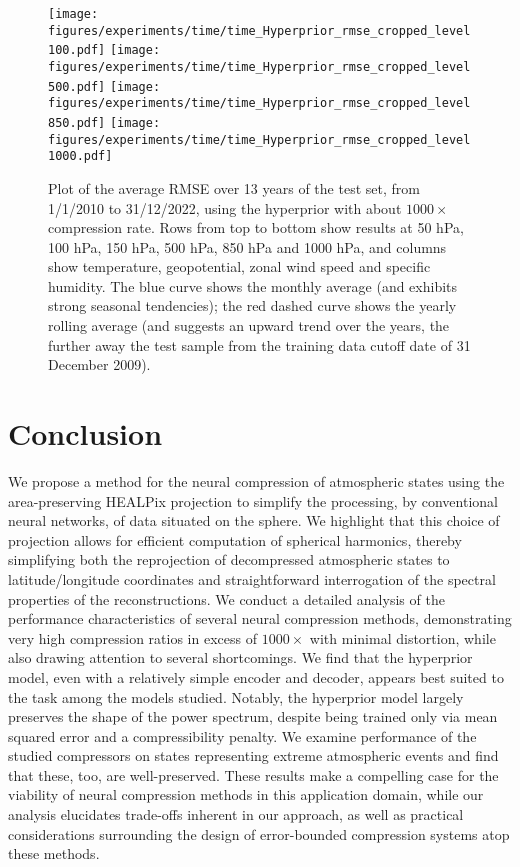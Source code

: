 \documentclass[11pt, a4paper, logo, copyright, numbering]{googledeepmind}
\begin{document}
\begin{figure}[tbp]
    \centering
    \texttt{[image: figures/experiments/time/time\_Hyperprior\_rmse\_cropped\_level100.pdf]}
    \texttt{[image: figures/experiments/time/time\_Hyperprior\_rmse\_cropped\_level500.pdf]}
    \texttt{[image: figures/experiments/time/time\_Hyperprior\_rmse\_cropped\_level850.pdf]}
    \texttt{[image: figures/experiments/time/time\_Hyperprior\_rmse\_cropped\_level1000.pdf]}
    \hfill
    \caption{Plot of the average RMSE over 13 years of the test set, from 1/1/2010 to 31/12/2022, using the hyperprior with about $1000\times$ compression rate. Rows from top to bottom show results at 50 hPa, 100 hPa, 150 hPa, 500 hPa, 850 hPa and 1000 hPa, and columns show temperature, geopotential, zonal wind speed and specific humidity. The blue curve shows the monthly average (and exhibits strong seasonal tendencies); the red dashed curve shows the yearly rolling average (and suggests an upward trend over the years, the further away the test sample from the training data cutoff date of 31 December 2009).}
    \label{fig:generalisation-time}
\end{figure} 
\section{Conclusion}
\label{sx:conclusion}

We propose a method for the neural compression of atmospheric states using the area-preserving HEALPix projection to simplify the processing, by conventional neural networks, of data situated on the sphere. We highlight that this choice of projection allows for efficient computation of spherical harmonics, thereby simplifying both the reprojection of decompressed atmospheric states to latitude/longitude coordinates and straightforward interrogation of the spectral properties of the reconstructions.
We conduct a detailed analysis of the performance characteristics of several neural compression methods, demonstrating very high compression ratios in excess of $1000\times$ with minimal distortion, while also drawing attention to several shortcomings.
We find that the hyperprior model, even with a relatively simple encoder and decoder, appears best suited to the task among the models studied.
Notably, the hyperprior model largely preserves the shape of the power spectrum, despite being trained only via mean squared error and a compressibility penalty.
We examine performance of the studied compressors on states representing extreme atmospheric events and find that these, too, are well-preserved.
These results make a compelling case for the viability of neural compression methods in this application domain, while our analysis elucidates trade-offs inherent in our approach, as well as practical considerations surrounding the design of error-bounded compression systems atop these methods.
\end{document}
